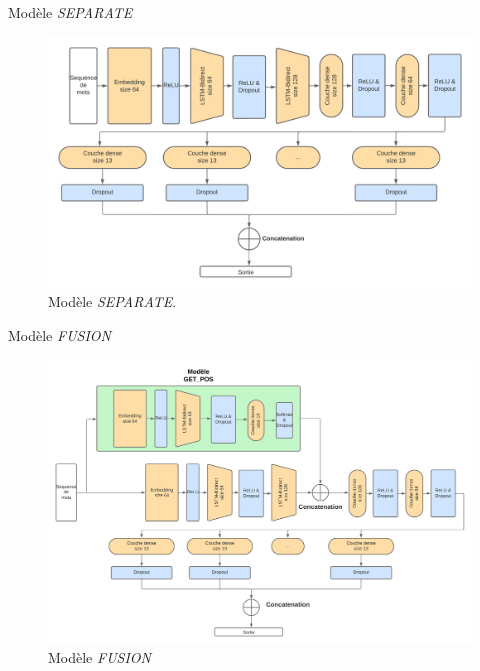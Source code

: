 \documentclass[11pt]{beamer}
\begin{document}
\begin{frame}{Modèle \textit{SEPARATE}}
    \begin{figure}
        \centering
        \includegraphics[width=\textwidth]{get_morphy_separate.png}
        \caption{Modèle \textit{SEPARATE}.}
        \label{fig: model separate}
    \end{figure}
\end{frame}

\begin{frame}{Modèle \textit{FUSION}}
    \begin{figure}[!ht]
        \centering
        \includegraphics[width=\textwidth]{get_morphy_fusion.png}
        \caption{Modèle \textit{FUSION}}
        \label{fig: model fusion}
    \end{figure}
\end{frame}
\end{document}
